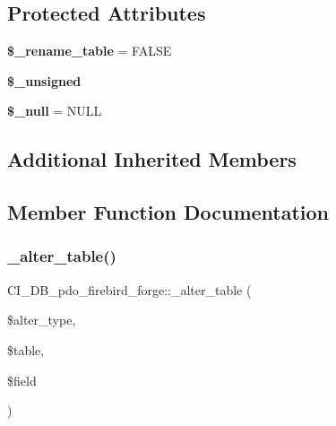 \subsection*{Protected Attributes}
\begin{DoxyCompactItemize}
\item 
\mbox{\label{class_c_i___d_b__pdo__firebird__forge_a729b24dd004e6832810379d91ce27404}} 
{\bfseries \$\+\_\+rename\+\_\+table} = F\+A\+L\+SE
\item 
{\bfseries \$\+\_\+unsigned}
\item 
\mbox{\label{class_c_i___d_b__pdo__firebird__forge_a7e3adfdf76e98bb85fd63a18c99df58f}} 
{\bfseries \$\+\_\+null} = \textquotesingle{}N\+U\+LL\textquotesingle{}
\end{DoxyCompactItemize}
\subsection*{Additional Inherited Members}


\subsection{Member Function Documentation}
\mbox{\label{class_c_i___d_b__pdo__firebird__forge_acb065cea86fac1f4f09192ed90aecfad}} 
\subsubsection{\texorpdfstring{\+\_\+alter\+\_\+table()}{\_alter\_table()}}
{\footnotesize\ttfamily C\+I\+\_\+\+D\+B\+\_\+pdo\+\_\+firebird\+\_\+forge\+::\+\_\+alter\+\_\+table (\begin{DoxyParamCaption}\item[{}]{\$alter\+\_\+type,  }\item[{}]{\$table,  }\item[{}]{\$field }\end{DoxyParamCaption})\hspace{0.3cm}{\ttfamily [protected]}}

